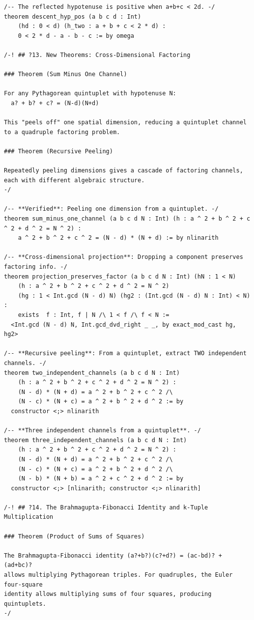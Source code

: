 \documentclass[11pt,twoside,openright]{book}
\theoremstyle{definition}
\theoremstyle{remark}
\begin{document}
\begin{lstlisting}[style=lean]
/-- The reflected hypotenuse is positive when a+b+c < 2d. -/
theorem descent_hyp_pos (a b c d : Int)
    (hd : 0 < d) (h_two : a + b + c < 2 * d) :
    0 < 2 * d - a - b - c := by omega

/-! ## ?13. New Theorems: Cross-Dimensional Factoring

### Theorem (Sum Minus One Channel)

For any Pythagorean quintuplet with hypotenuse N:
  a? + b? + c? = (N-d)(N+d)

This "peels off" one spatial dimension, reducing a quintuplet channel
to a quadruple factoring problem.

### Theorem (Recursive Peeling)

Repeatedly peeling dimensions gives a cascade of factoring channels,
each with different algebraic structure.
-/

/-- **Verified**: Peeling one dimension from a quintuplet. -/
theorem sum_minus_one_channel (a b c d N : Int) (h : a ^ 2 + b ^ 2 + c ^ 2 + d ^ 2 = N ^ 2) :
    a ^ 2 + b ^ 2 + c ^ 2 = (N - d) * (N + d) := by nlinarith

/-- **Cross-dimensional projection**: Dropping a component preserves factoring info. -/
theorem projection_preserves_factor (a b c d N : Int) (hN : 1 < N)
    (h : a ^ 2 + b ^ 2 + c ^ 2 + d ^ 2 = N ^ 2)
    (hg : 1 < Int.gcd (N - d) N) (hg2 : (Int.gcd (N - d) N : Int) < N) :
    exists  f : Int, f | N /\ 1 < f /\ f < N :=
  <Int.gcd (N - d) N, Int.gcd_dvd_right _ _, by exact_mod_cast hg, hg2>

/-- **Recursive peeling**: From a quintuplet, extract TWO independent channels. -/
theorem two_independent_channels (a b c d N : Int)
    (h : a ^ 2 + b ^ 2 + c ^ 2 + d ^ 2 = N ^ 2) :
    (N - d) * (N + d) = a ^ 2 + b ^ 2 + c ^ 2 /\
    (N - c) * (N + c) = a ^ 2 + b ^ 2 + d ^ 2 := by
  constructor <;> nlinarith

/-- **Three independent channels from a quintuplet**. -/
theorem three_independent_channels (a b c d N : Int)
    (h : a ^ 2 + b ^ 2 + c ^ 2 + d ^ 2 = N ^ 2) :
    (N - d) * (N + d) = a ^ 2 + b ^ 2 + c ^ 2 /\
    (N - c) * (N + c) = a ^ 2 + b ^ 2 + d ^ 2 /\
    (N - b) * (N + b) = a ^ 2 + c ^ 2 + d ^ 2 := by
  constructor <;> [nlinarith; constructor <;> nlinarith]

/-! ## ?14. The Brahmagupta-Fibonacci Identity and k-Tuple Multiplication

### Theorem (Product of Sums of Squares)

The Brahmagupta-Fibonacci identity (a?+b?)(c?+d?) = (ac-bd)? + (ad+bc)?
allows multiplying Pythagorean triples. For quadruples, the Euler four-square
identity allows multiplying sums of four squares, producing quintuplets.
-/


\end{lstlisting}
\end{document}
